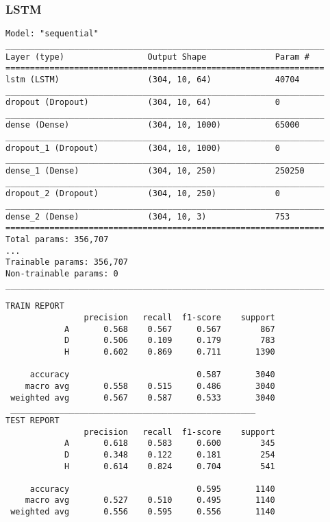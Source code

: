 \subsubsection*{LSTM}
\begin{lstlisting}[style=arch]
Model: "sequential"
_________________________________________________________________
Layer (type)                 Output Shape              Param #   
=================================================================
lstm (LSTM)                  (304, 10, 64)             40704     
_________________________________________________________________
dropout (Dropout)            (304, 10, 64)             0         
_________________________________________________________________
dense (Dense)                (304, 10, 1000)           65000     
_________________________________________________________________
dropout_1 (Dropout)          (304, 10, 1000)           0         
_________________________________________________________________
dense_1 (Dense)              (304, 10, 250)            250250    
_________________________________________________________________
dropout_2 (Dropout)          (304, 10, 250)            0         
_________________________________________________________________
dense_2 (Dense)              (304, 10, 3)              753       
=================================================================
Total params: 356,707
...
Trainable params: 356,707
Non-trainable params: 0
_________________________________________________________________

\end{lstlisting}

\begin{lstlisting}[style=report]
TRAIN REPORT
                precision   recall  f1-score    support
            A       0.568    0.567     0.567        867
            D       0.506    0.109     0.179        783
            H       0.602    0.869     0.711       1390

     accuracy                          0.587       3040
    macro avg       0.558    0.515     0.486       3040
 weighted avg       0.567    0.587     0.533       3040
 __________________________________________________
TEST REPORT
                precision   recall  f1-score    support
            A       0.618    0.583     0.600        345
            D       0.348    0.122     0.181        254
            H       0.614    0.824     0.704        541

     accuracy                          0.595       1140
    macro avg       0.527    0.510     0.495       1140
 weighted avg       0.556    0.595     0.556       1140
\end{lstlisting}

